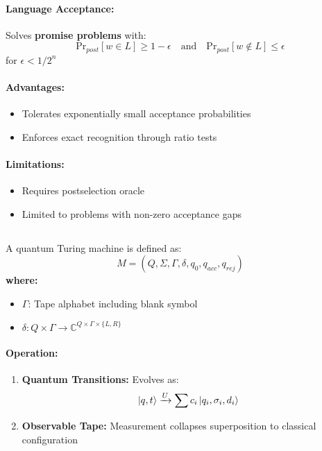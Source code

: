 \paragraph{Language Acceptance:}
Solves \textbf{promise problems} with:
\[
\text{Pr}_{post}[w \in L] \geq 1 - \epsilon \quad \text{and} \quad \text{Pr}_{post}[w \notin L] \leq \epsilon
\]
for $\epsilon < 1/2^n$

\paragraph{Advantages:}
\begin{itemize}
    \item Tolerates exponentially small acceptance probabilities
    \item Enforces exact recognition through ratio tests
\end{itemize}

\paragraph{Limitations:}
\begin{itemize}
    \item Requires postselection oracle
    \item Limited to problems with non-zero acceptance gaps
\end{itemize}

\subsection{}
\label{subsec:qtm}

\begin{definition}
A quantum Turing machine is defined as:
\[
M = (Q, \Sigma, \Gamma, \delta, q_0, q_{acc}, q_{rej})
\]
\textbf{where:}
\begin{itemize}
    \item $\Gamma$: Tape alphabet including blank symbol
    \item $\delta: Q \times \Gamma \rightarrow \mathbb{C}^{Q \times \Gamma \times \{L,R\}}$
\end{itemize}
\end{definition}

\paragraph{Operation:}
\begin{enumerate}
    \item \textbf{Quantum Transitions:} Evolves as:
    \[
    \ket{q,t} \xrightarrow{U} \sum c_i \ket{q_i,\sigma_i,d_i}
    \]
    \item \textbf{Observable Tape:} Measurement collapses superposition to classical configuration
\end{enumerate}

